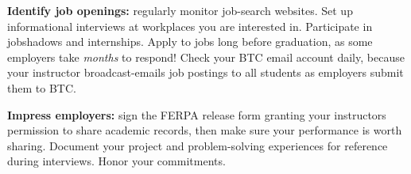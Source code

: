 \vskip 10pt

\noindent

\vskip 10pt

\noindent

\vskip 10pt

\noindent

\vskip 10pt

\noindent

\vskip 10pt

\noindent
{\bf Identify job openings:} regularly monitor job-search websites.  Set up informational interviews at workplaces you are interested in.  Participate in jobshadows and internships.  Apply to jobs long before graduation, as some employers take {\it months} to respond!  Check your BTC email account daily, because your instructor broadcast-emails job postings to all students as employers submit them to BTC.

\vskip 10pt

\noindent
{\bf Impress employers:} sign the FERPA release form granting your instructors permission to share academic records, then make sure your performance is worth sharing.  Document your project and problem-solving experiences for reference during interviews.  Honor  your commitments.

